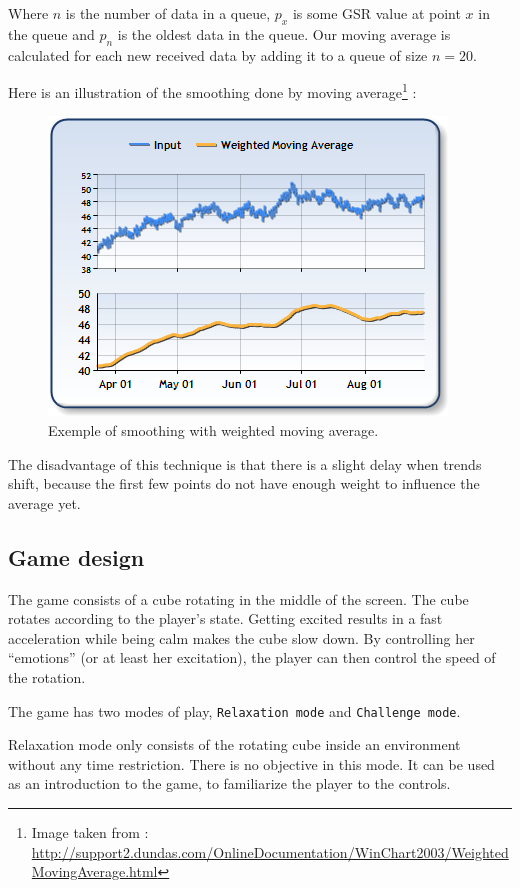 \documentclass[12pt,a4paper]{article}
\begin{document}
Where $n$ is the number of data in a queue, $p_x$ is some GSR value at point $x$ in the queue and $p_n$ is the oldest data in the queue. Our moving average is calculated for each new received data by adding it to a queue of size $n=20$.

Here is an illustration of the smoothing done by moving average\footnote{Image taken from : \\ \hyperref[]{http://support2.dundas.com/OnlineDocumentation/WinChart2003/WeightedMovingAverage.html}} :

\begin{figure}[H] 
\centering
\includegraphics{WeightedMovingAverage.png}
\caption{Exemple of smoothing with weighted moving average.}
\end{figure}

The disadvantage of this technique is that there is a slight delay when trends shift, because the first few points do not have enough weight to influence the average yet.

\subsection{Game design}

The game consists of a cube rotating in the middle of the screen. The cube rotates according to the player's state. Getting excited results in a fast acceleration while being calm makes the cube slow down. By controlling her ``emotions'' (or at least her excitation), the player can then control the speed of the rotation.

The game has two modes of play, \texttt{Relaxation mode} and \texttt{Challenge mode}. 

Relaxation mode only consists of the rotating cube inside an environment without any time restriction. There is no objective in this mode. It can be used as an introduction to the game, to familiarize the player to the controls.
\end{document}
